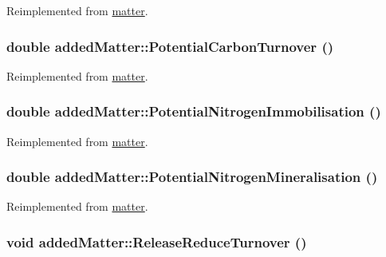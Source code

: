 Reimplemented from \hyperlink{classmatter_a838d402c6b41deb9d9c20eeabecd94a8}{matter}.\hypertarget{classadded_matter_ac3cf951aba3e5001b9e7d582084863bf}{
\subsubsection[{PotentialCarbonTurnover}]{\setlength{\rightskip}{0pt plus 5cm}double addedMatter::PotentialCarbonTurnover ()}}
\label{classadded_matter_ac3cf951aba3e5001b9e7d582084863bf}


Reimplemented from \hyperlink{classmatter_ad8531740a6494ac68f0223cd49d272eb}{matter}.\hypertarget{classadded_matter_a68f5728f82221029360bb31ba2fc1673}{
\subsubsection[{PotentialNitrogenImmobilisation}]{\setlength{\rightskip}{0pt plus 5cm}double addedMatter::PotentialNitrogenImmobilisation ()}}
\label{classadded_matter_a68f5728f82221029360bb31ba2fc1673}


Reimplemented from \hyperlink{classmatter_a302a5c72c1cbe1c3d62f01d07f25cd4c}{matter}.\hypertarget{classadded_matter_a972a4d0ee6fbd8ca8c48be2162c85646}{
\subsubsection[{PotentialNitrogenMineralisation}]{\setlength{\rightskip}{0pt plus 5cm}double addedMatter::PotentialNitrogenMineralisation ()}}
\label{classadded_matter_a972a4d0ee6fbd8ca8c48be2162c85646}


Reimplemented from \hyperlink{classmatter_a59fa9a6e0ff21bac9ab9fb5b4de9392f}{matter}.\hypertarget{classadded_matter_a899b9d029676aa6711339be2479b29d3}{
\subsubsection[{ReleaseReduceTurnover}]{\setlength{\rightskip}{0pt plus 5cm}void addedMatter::ReleaseReduceTurnover ()}}
\label{classadded_matter_a899b9d029676aa6711339be2479b29d3}


